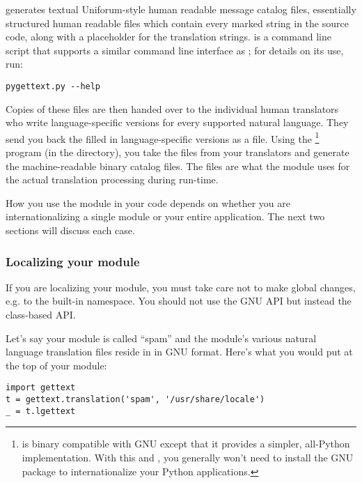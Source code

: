  generates textual Uniforum-style human readable
message catalog  files, essentially structured human
readable files which contain every marked string in the source code,
along with a placeholder for the translation strings.
 is a command line script that supports a similar
command line interface as ; for details on its use,
run:

\begin{verbatim}
pygettext.py --help
\end{verbatim}

Copies of these  files are then handed over to the
individual human translators who write language-specific versions for
every supported natural language.  They send you back the filled in
language-specific versions as a  file.  Using the
\footnote{ is binary
compatible with GNU  except that it provides a
simpler, all-Python implementation.  With this and
, you generally won't need to install the GNU
 package to internationalize your Python
applications.} program (in the  directory), you take the
 files from your translators and generate the
machine-readable  binary catalog files.  The 
files are what the  module uses for the actual
translation processing during run-time.

How you use the  module in your code depends on
whether you are internationalizing a single module or your entire application.
The next two sections will discuss each case.

\subsubsection{Localizing your module}

If you are localizing your module, you must take care not to make
global changes, e.g. to the built-in namespace.  You should not use
the GNU  API but instead the class-based API.  

Let's say your module is called ``spam'' and the module's various
natural language translation  files reside in
 in GNU  format.  Here's what
you would put at the top of your module:

\begin{verbatim}
import gettext
t = gettext.translation('spam', '/usr/share/locale')
_ = t.lgettext
\end{verbatim}

